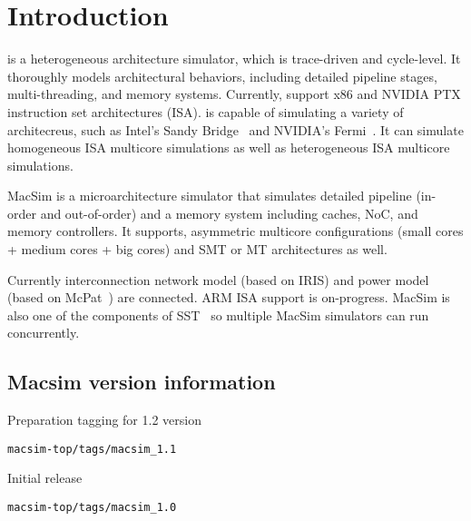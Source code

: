 


\chapter{Introduction}


\SIM is a heterogeneous architecture simulator, which is trace-driven
and cycle-level. It thoroughly models architectural behaviors,
including detailed pipeline stages, multi-threading, and memory
systems. Currently, \SIM support x86 and NVIDIA PTX instruction set
architectures (ISA). \SIM is capable of simulating a variety of
architecreus, such as Intel's Sandy Bridge~\cite{sandybridge} and
NVIDIA's Fermi~\cite{fermi}.  It can simulate homogeneous ISA
multicore simulations as well as heterogeneous ISA multicore
simulations.

MacSim is a microarchitecture simulator that simulates detailed
pipeline (in-order and out-of-order) and a memory system including
caches, NoC, and memory controllers. It supports, asymmetric multicore
configurations (small cores + medium cores + big cores) and SMT or MT
architectures as well.

Currently interconnection network model (based on IRIS) and power
model (based on McPat~\cite{mcpat}) are connected. ARM ISA support is
on-progress. MacSim is also one of the components of SST~\cite{sst} so
multiple MacSim simulators can run concurrently.





\section*{Macsim version information}


\begingroup
\renewcommand\descriptionlabel[1]{\textit{\hspace\labelsep{#1}}}
\begin{description}\firmlist
\item[1.1 - September 26, 2012] Preparation tagging for 1.2 version 

  \Verb+macsim-top/tags/macsim_1.1+ 

\item[1.0 - February, 2012] Initial release

  \Verb+macsim-top/tags/macsim_1.0+ 
\end{description}
\endgroup
















